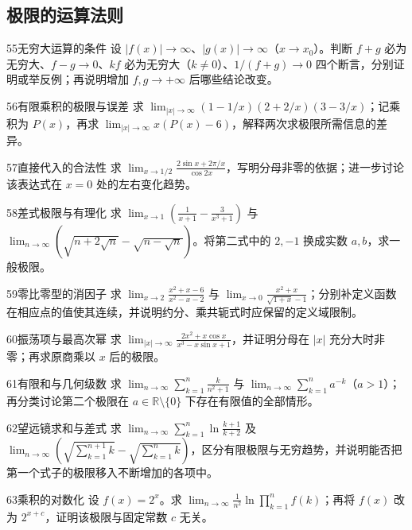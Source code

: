 \subsection{极限的运算法则}
\begin{exercise}{55}{无穷大运算的条件}
设 $|f(x)|\to\infty$、$|g(x)|\to\infty$（$x\to x_0$）。判断 $f+g$ 必为无穷大、$f-g\to0$、$kf$ 必为无穷大（$k\ne0$）、$1/(f+g)\to0$ 四个断言，分别证明或举反例；再说明增加 $f,g\to+\infty$ 后哪些结论改变。
\end{exercise}
\begin{exercise}{56}{有限乘积的极限与误差}
求 $\lim_{|x|\to\infty}(1-1/x)(2+2/x)(3-3/x)$；记乘积为 $P(x)$，再求 $\lim_{|x|\to\infty}x(P(x)-6)$，解释两次求极限所需信息的差异。
\end{exercise}
\begin{exercise}{57}{直接代入的合法性}
求 $\lim_{x\to1/2}\frac{2\sin x+2\pi/x}{\cos2x}$，写明分母非零的依据；进一步讨论该表达式在 $x=0$ 处的左右变化趋势。
\end{exercise}
\begin{exercise}{58}{差式极限与有理化}
求 $\lim_{x\to1}\left(\frac1{x+1}-\frac3{x^3+1}\right)$ 与 $\lim_{n\to\infty}(\sqrt{n+2\sqrt n}-\sqrt{n-\sqrt n})$。将第二式中的 $2,-1$ 换成实数 $a,b$，求一般极限。
\end{exercise}
\begin{exercise}{59}{零比零型的消因子}
求 $\lim_{x\to2}\frac{x^2+x-6}{x^2-x-2}$ 与 $\lim_{x\to0}\frac{x^2+x}{\sqrt{1+x}-1}$；分别补定义函数在相应点的值使其连续，并说明约分、乘共轭式时应保留的定义域限制。
\end{exercise}
\begin{exercise}{60}{振荡项与最高次幂}
求 $\lim_{|x|\to\infty}\frac{2x^2+x\cos x}{x^3-x\sin x+1}$，并证明分母在 $|x|$ 充分大时非零；再求原商乘以 $x$ 后的极限。
\end{exercise}
\begin{exercise}{61}{有限和与几何级数}
求 $\lim_{n\to\infty}\sum_{k=1}^n\frac{k}{n^2+1}$ 与 $\lim_{n\to\infty}\sum_{k=1}^na^{-k}$（$a>1$）；再分类讨论第二个极限在 $a\in\mathbb R\setminus\{0\}$ 下存在有限值的全部情形。
\end{exercise}
\begin{exercise}{62}{望远镜求和与差式}
求 $\lim_{n\to\infty}\sum_{k=1}^n\ln\frac{k+1}{k+2}$ 及 $\lim_{n\to\infty}\left(\sqrt{\sum_{k=1}^{n+1}k}-\sqrt{\sum_{k=1}^nk}\right)$，区分有限极限与无穷趋势，并说明能否把第一个式子的极限移入不断增加的各项中。
\end{exercise}
\begin{exercise}{63}{乘积的对数化}
设 $f(x)=2^x$。求 $\lim_{n\to\infty}\frac1{n^2}\ln\prod_{k=1}^nf(k)$；再将 $f(x)$ 改为 $2^{x+c}$，证明该极限与固定常数 $c$ 无关。
\end{exercise}
